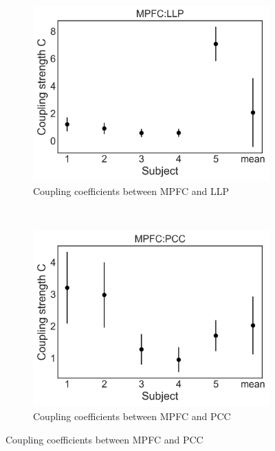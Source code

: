 \documentclass[%
 reprint,
 amsmath,amssymb,
 aps,
]{revtex4-1}
\begin{document}
\begin{figure}[H]
    \centering
    \begin{subfigure}[b]{0.4\textwidth}
        \includegraphics[width=\textwidth]{mpfc_llpMCMC.png}
        \caption{Coupling coefficients between MPFC and LLP}
        \label{fig:mpfc_llp}
    \end{subfigure}
    ~ %
    \begin{subfigure}[b]{0.4\textwidth}
        \includegraphics[width=\textwidth]{mpfc_pccMCMC.png}
        \caption{Coupling coefficients between MPFC and PCC}
        \label{fig:mpfc_pcc}
    \end{subfigure}

\end{figure}
\end{document}
